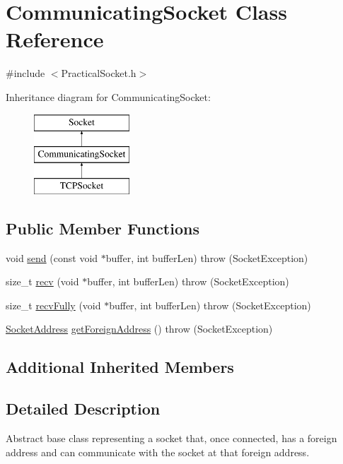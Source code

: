 \hypertarget{class_communicating_socket}{}\section{Communicating\+Socket Class Reference}
\label{class_communicating_socket}


{\ttfamily \#include $<$Practical\+Socket.\+h$>$}

Inheritance diagram for Communicating\+Socket\+:\begin{figure}[H]
\begin{center}
\leavevmode
\includegraphics[height=3.000000cm]{class_communicating_socket}
\end{center}
\end{figure}
\subsection*{Public Member Functions}
\begin{DoxyCompactItemize}
\item 
void \hyperlink{class_communicating_socket_aca4e86085c064641e86ae24ea29bbb94}{send} (const void $\ast$buffer, int buffer\+Len)  throw (\+Socket\+Exception)
\item 
size\+\_\+t \hyperlink{class_communicating_socket_aaec5ba688c6f668d05d52548ecec8546}{recv} (void $\ast$buffer, int buffer\+Len)  throw (\+Socket\+Exception)
\item 
size\+\_\+t \hyperlink{class_communicating_socket_a52dd0d72509bee3a7c0ca89a7592a023}{recv\+Fully} (void $\ast$buffer, int buffer\+Len)  throw (\+Socket\+Exception)
\item 
\hyperlink{class_socket_address}{Socket\+Address} \hyperlink{class_communicating_socket_a59ad3bbba5b64f9e251d9228d2ee755d}{get\+Foreign\+Address} ()  throw (\+Socket\+Exception)
\end{DoxyCompactItemize}
\subsection*{Additional Inherited Members}


\subsection{Detailed Description}
Abstract base class representing a socket that, once connected, has a foreign address and can communicate with the socket at that foreign address. 

